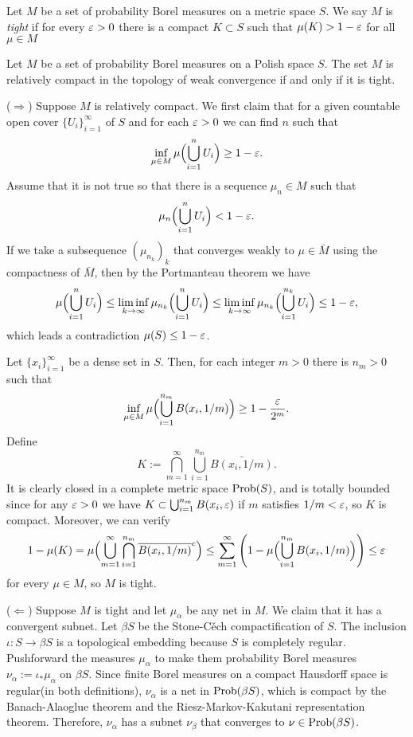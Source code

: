 \documentclass[10pt]{article}
\begin{document}
\begin{defn}
Let $M$ be a set of probability Borel measures on a metric space $S$.
We say $M$ is \emph{tight} if for every $\varepsilon>0$ there is a compact $K\subset S$ such that $\mu(K)>1-\varepsilon$ for all $\mu\in M$
\end{defn}
\begin{thm}
Let $M$ be a set of probability Borel measures on a Polish space $S$.
The set $M$ is relatively compact in the topology of weak convergence if and only if it is tight.
\end{thm}
\begin{pf}
($\Rightarrow$)
Suppose $M$ is relatively compact.
We first claim that for a given countable open cover $\{U_i\}_{i=1}^\infty$ of $S$ and for each $\varepsilon>0$ we can find $n$ such that
\[\inf_{\mu\in M}\mu\Bigl(\bigcup_{i=1}^nU_i\Bigr)\ge1-\varepsilon.\]
Assume that it is not true so that there is a sequence $\mu_n\in M$ such that
\[\mu_n\Bigl(\bigcup_{i=1}^nU_i\Bigr)<1-\varepsilon.\]
If we take a subsequence $(\mu_{n_k})_k$ that converges weakly to $\mu\in\bar M$ using the compactness of $\bar M$, then by the Portmanteau theorem we have
\[\mu\Bigl(\bigcup_{i=1}^nU_i\Bigr)\le\liminf_{k\to\infty}\mu_{n_k}\Bigl(\bigcup_{i=1}^nU_i\Bigr)\le\liminf_{k\to\infty}\mu_{n_k}\Bigl(\bigcup_{i=1}^{n_k}U_i\Bigr)\le1-\varepsilon,\]
which leads a contradiction $\mu(S)\le1-\varepsilon$.

Let $\{x_i\}_{i=1}^\infty$ be a dense set in $S$.
Then, for each integer $m>0$ there is $n_m>0$ such that
\[\inf_{\mu\in M}\mu\Bigl(\bigcup_{i=1}^{n_m}B(x_i,1/m)\Bigr)\ge1-\frac{\varepsilon}{2^m}.\]
Define
\[K:=\bigcap_{m=1}^\infty\bigcup_{i=1}^{n_m}\bar{B(x_i,1/m)}.\]
It is clearly closed in a complete metric space $\operatorname{Prob}(S)$, and is totally bounded since for any $\varepsilon>0$ we have $K\subset\bigcup_{i=1}^{n_m}B(x_i,\varepsilon)$ if $m$ satisfies $1/m<\varepsilon$, so $K$ is compact.
Moreover, we can verify
\[1-\mu(K)=\mu\Bigl(\bigcup_{m=1}^\infty\bigcap_{i=1}^{n_m}\overline{B(x_i,1/m)}^c\Bigr)\le\sum_{m=1}^\infty\left(1-\mu\Bigl(\bigcup_{i=1}^{n_m}B(x_i,1/m)\Bigr)\right)\le\varepsilon\]
for every $\mu\in M$, so $M$ is tight.

($\Leftarrow$)
Suppose $M$ is tight and let $\mu_\alpha$ be any net in $M$.
We claim that it has a convergent subnet.
Let $\beta S$ be the Stone-C\v ech compactification of $S$.
The inclusion $\iota:S\to\beta S$ is a topological embedding because $S$ is completely regular.
Pushforward the measures $\mu_\alpha$ to make them probability Borel measures $\nu_\alpha:=\iota_*\mu_\alpha$ on $\beta S$.
Since finite Borel measures on a compact Hausdorff space is regular(in both definitions), $\nu_\alpha$ is a net in $\operatorname{Prob}(\beta S)$, which is compact by the Banach-Alaoglue theorem and the Riesz-Markov-Kakutani representation theorem.
Therefore, $\nu_\alpha$ has a subnet $\nu_\beta$ that converges to $\nu\in\operatorname{Prob}(\beta S)$.


\end{pf}
\end{document}
